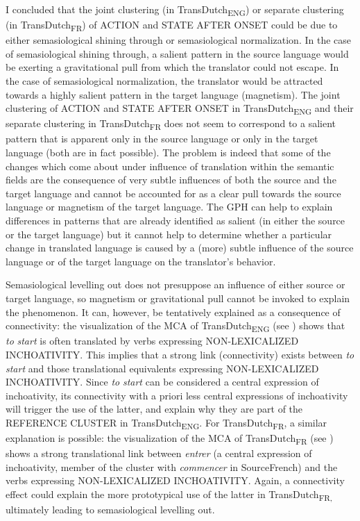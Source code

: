 I concluded that the joint clustering (in TransDutch\textsubscript{ENG}) or separate clustering (in TransDutch\textsubscript{FR}) of ACTION and STATE AFTER ONSET could be due to either semasiological shining through or semasiological normalization. In the case of semasiological shining through, a salient pattern in the source language would be exerting a gravitational pull from which the translator could not escape. In the case of semasiological normalization, the translator would be attracted towards a highly salient pattern in the target language (magnetism). The joint clustering of ACTION and STATE AFTER ONSET in TransDutch\textsubscript{ENG} and their separate clustering in TransDutch\textsubscript{FR} does not seem to correspond to a salient pattern that is apparent only in the source language or only in the target language (both are in fact possible). The problem is indeed that some of the changes which come about under influence of translation within the semantic fields are the consequence of very subtle influences of both the source and the target language and cannot be accounted for as a clear pull towards the source language or magnetism of the target language. The GPH can help to explain differences in patterns that are already identified as salient (in either the source or the target language) but it cannot help to determine whether a particular change in translated language is caused by a (more) subtle influence of the source language or of the target language on the translator’s behavior.

Semasiological levelling out does not presuppose an influence of either source or target language, so magnetism or gravitational pull cannot be invoked to explain the phenomenon. It can, however, be tentatively explained as a consequence of connectivity: the visualization of the MCA of TransDutch\textsubscript{ENG} (see ) shows that \textit{to} \textit{start} is often translated by verbs expressing NON-LEXICALIZED INCHOATIVITY. This implies that a strong link (connectivity) exists between \textit{to} \textit{start} and those translational equivalents expressing NON-LEXICALIZED INCHOATIVITY. Since \textit{to} \textit{start} can be considered a central expression of inchoativity, its connectivity with a priori less central expressions of inchoativity will trigger the use of the latter, and explain why they are part of the REFERENCE CLUSTER in TransDutch\textsubscript{ENG}. For TransDutch\textsubscript{FR}, a similar explanation is possible: the visualization of the MCA of TransDutch\textsubscript{FR} (see ) shows a strong translational link between \textit{entrer} (a central expression of inchoativity, member of the cluster with \textit{commencer} in SourceFrench) and the verbs expressing NON-LEXICALIZED INCHOATIVITY. Again, a connectivity effect could explain the more prototypical use of the latter in TransDutch\textsubscript{FR,} ultimately leading to semasiological levelling out.

